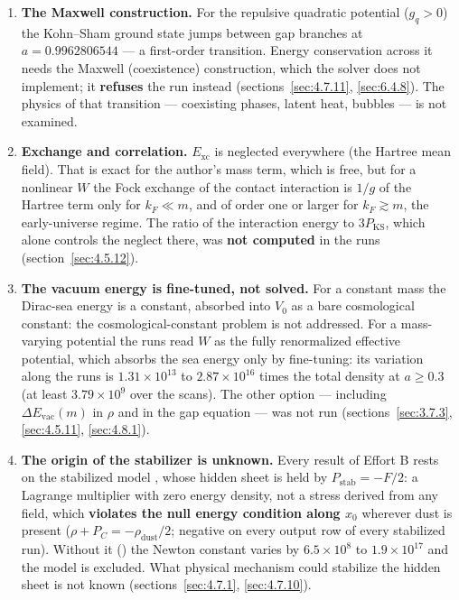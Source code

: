 \begin{enumerate}
  \item \textbf{The Maxwell construction.} For the repulsive quadratic potential ($g_q > 0$) the Kohn--Sham ground state jumps between gap branches at $a = 0.9962806544$ --- a first-order transition. Energy conservation across it needs the Maxwell (coexistence) construction, which the solver does not implement; it \textbf{refuses} the run instead (sections~\ref{sec:4.7.11}, \ref{sec:6.4.8}). The physics of that transition --- coexisting phases, latent heat, bubbles --- is not examined.
  \item \textbf{Exchange and correlation.} $E_{\mathrm{xc}}$ is neglected everywhere (the Hartree mean field). That is exact for the author's mass term, which is free, but for a nonlinear $W$ the Fock exchange of the contact interaction is $1/g$ of the Hartree term only for $k_F \ll m$, and of order one or larger for $k_F \gtrsim m$, the early-universe regime. The ratio of the interaction energy to $3 P_{\mathrm{KS}}$, which alone controls the neglect there, was \textbf{not computed} in the runs (section~\ref{sec:4.5.12}).
  \item \textbf{The vacuum energy is fine-tuned, not solved.} For a constant mass the Dirac-sea energy is a constant, absorbed into $V_0$ as a bare cosmological constant: the cosmological-constant problem is not addressed. For a mass-varying potential the runs read $W$ as the fully renormalized effective potential, which absorbs the sea energy only by fine-tuning: its variation along the runs is $1.31\times10^{13}$ to $2.87\times10^{16}$ times the total density at $a \geq 0.3$ (at least $3.79\times10^{9}$ over the scans). The other option --- including $\Delta E_{\mathrm{vac}}(m)$ in $\rho$ and in the gap equation --- was not run (sections~\ref{sec:3.7.3}, \ref{sec:4.5.11}, \ref{sec:4.8.1}).
  \item \textbf{The origin of the stabilizer is unknown.} Every result of Effort B rests on the stabilized model , whose hidden sheet is held by $P_{\mathrm{stab}} = -F/2$: a Lagrange multiplier with zero energy density, not a stress derived from any field, which \textbf{violates the null energy condition along $x_{0}$} wherever dust is present ($\rho + P_C = -\rho_{\mathrm{dust}}/2$; negative on every output row of every stabilized run). Without it () the Newton constant varies by $6.5\times10^{8}$ to $1.9\times10^{17}$ and the model is excluded. What physical mechanism could stabilize the hidden sheet is not known (sections~\ref{sec:4.7.1}, \ref{sec:4.7.10}).

\end{enumerate}
